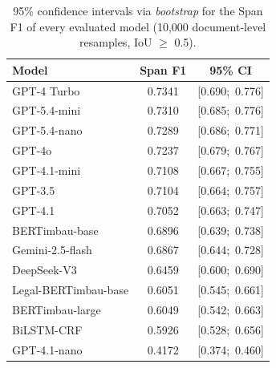 \begin{table}[ht]
    \centering
    \caption{95\% confidence intervals via \textit{bootstrap} for the Span F1 of every evaluated model (10,000 document-level resamples, IoU $\geq$ 0.5).}
    \label{tab:bootstrap_ic}
    \small
    \begin{tabular}{lcc}
        \hline
        \textbf{Model} & \textbf{Span F1} & \textbf{95\% CI} \\
        \hline
        GPT-4 Turbo                         & 0.7341 & [0.690;\ 0.776] \\
        GPT-5.4-mini                        & 0.7310 & [0.685;\ 0.776] \\
        GPT-5.4-nano                        & 0.7289 & [0.686;\ 0.771] \\
        GPT-4o                              & 0.7237 & [0.679;\ 0.767] \\
        GPT-4.1-mini                        & 0.7108 & [0.667;\ 0.755] \\
        GPT-3.5                             & 0.7104 & [0.664;\ 0.757] \\
        GPT-4.1                             & 0.7052 & [0.663;\ 0.747] \\
        BERTimbau-base                      & 0.6896 & [0.639;\ 0.738] \\
        Gemini-2.5-flash                    & 0.6867 & [0.644;\ 0.728] \\
        DeepSeek-V3                         & 0.6459 & [0.600;\ 0.690] \\
        Legal-BERTimbau-base                & 0.6051 & [0.545;\ 0.661] \\
        BERTimbau-large                     & 0.6049 & [0.542;\ 0.663] \\
        BiLSTM-CRF                          & 0.5926 & [0.528;\ 0.656] \\
        GPT-4.1-nano                        & 0.4172 & [0.374;\ 0.460] \\
        \hline
    \end{tabular}
\end{table}
